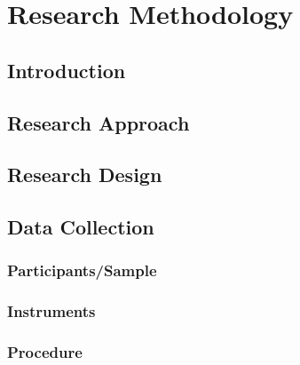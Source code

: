 \chapter{Research Methodology}
\label{chapter:methodology}


\section{Introduction}

\section{Research Approach}

\section{Research Design}

\section{Data Collection}

\subsection{Participants/Sample}

\subsection{Instruments}

\subsection{Procedure}

